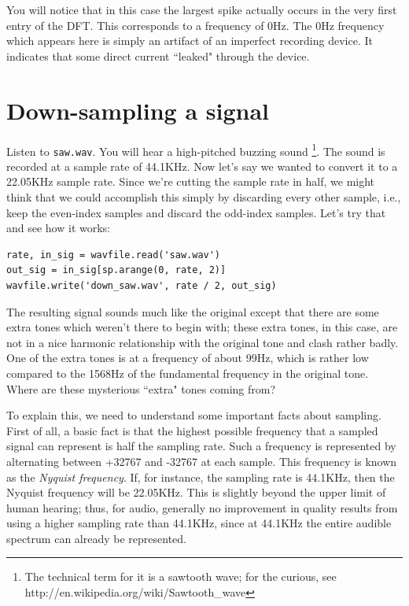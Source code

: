 You will notice that in this case the largest spike actually occurs in the very first entry of the DFT.
This corresponds to a frequency of 0Hz.
The 0Hz frequency which appears here is simply an artifact of an imperfect recording device.
It indicates that some direct current ``leaked" through the device.



\section*{Down-sampling a signal}

Listen to \texttt{saw.wav}.
You will hear a high-pitched buzzing sound \footnote{The technical term for it is a sawtooth wave; for the curious, see http://en.wikipedia.org/wiki/Sawtooth\_wave}.
The sound is recorded at a sample rate of 44.1KHz.
Now let's say we wanted to convert it to a 22.05KHz sample rate.
Since we're cutting the sample rate in half, we might think that we could accomplish this simply by discarding every other sample, i.e., keep the even-index samples and discard the odd-index samples.
Let's try that and see how it works:
\begin{lstlisting}
rate, in_sig = wavfile.read('saw.wav')
out_sig = in_sig[sp.arange(0, rate, 2)]
wavfile.write('down_saw.wav', rate / 2, out_sig)
\end{lstlisting}
The resulting signal sounds much like the original except that there are some extra tones which weren't there to begin with; these extra tones, in this case, are not in a nice harmonic relationship with the original tone and clash rather badly.
One of the extra tones is at a frequency of about 99Hz, which is rather low compared to the 1568Hz of the fundamental frequency in the original tone.
Where are these mysterious ``extra" tones coming from?

To explain this, we need to understand some important facts about sampling.
First of all, a basic fact is that the highest possible frequency that a sampled signal can represent is half the sampling rate.
Such a frequency is represented by alternating between +32767 and -32767 at each sample.
This frequency is known as the \emph{Nyquist frequency}.
If, for instance, the sampling rate is 44.1KHz, then the Nyquist frequency will be 22.05KHz.
This is slightly beyond the upper limit of human hearing; thus, for audio, generally no improvement in quality results from using a higher sampling rate than 44.1KHz, since at 44.1KHz the entire audible spectrum can already be represented.

